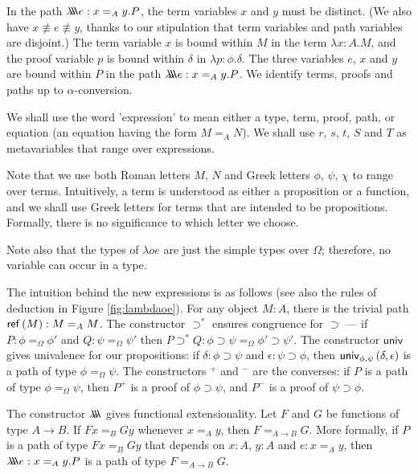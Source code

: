 In the path $\lambda \!\! \lambda \!\! \lambda e : x =_A y . P$, the term variables $x$ and $y$ must be distinct.  (We also have $x \not\equiv e \not\equiv y$, thanks to our
stipulation that term variables and path variables are disjoint.)  The term variable $x$ is bound within $M$ in the term $\lambda x:A.M$,
and the proof variable $p$ is bound within $\delta$ in $\lambda p:\phi.\delta$.  The three variables $e$, $x$ and $y$ are bound within $P$ in the path
$\lambda \!\! \lambda \!\! \lambda e:x =_A y.P$.  We identify terms, proofs and paths up to $\alpha$-conversion.

We shall use the word 'expression' to mean either a type, term, proof, path, or equation (an equation having the form $M =_A N$).  We shall use $r$, $s$, $t$, $S$ and $T$ as metavariables that range over expressions.

Note that we use both Roman letters $M$, $N$ and Greek letters $\phi$, $\psi$, $\chi$ to range over terms.  Intuitively, a term is understood as either a proposition or a function,
and we shall use Greek letters for terms that are intended to be propositions.  Formally, there is no significance to which letter we choose.

Note also that the types of $\lambda o e$ are just the simple types over $\Omega$; therefore, no variable can occur in a type.

The intuition behind the new expressions is as follows (see also the rules of deduction in Figure \ref{fig:lambdaoe}).  For any object $M : A$, there is the trivial path $\mathsf{ref} \left( {M} \right) : M =_A M$.  The constructor $\supset^*$ ensures congruence for $\supset$ --- if $P : \phi =_\Omega \phi'$ and $Q : \psi =_\Omega \psi'$ then $P \supset^* Q : \phi \supset \psi =_\Omega \phi' \supset \psi'$.  The constructor $\mathsf{univ}$ gives univalence for our propositions: if $\delta : \phi \supset \psi$ and $\epsilon : \psi \supset \phi$, then $\mathsf{univ}_{{\phi} , {\psi}} \left( {\delta} , {\epsilon} \right)$ is a path of type $\phi =_\Omega \psi$.  The constructors $^+$ and $^-$ are the converses: if $P$ is a path of type $\phi =_\Omega \psi$, then $P^+$ is a proof of $\phi \supset \psi$, and $P^-$ is a proof of $\psi \supset \phi$.

The constructor $\lambda \!\! \lambda \!\! \lambda$ gives functional extensionality.  Let $F$ and $G$ be functions of type $A \rightarrow B$.  If $F x =_B G y$ whenever $x =_A y$, then $F =_{A \rightarrow B} G$.  More formally, if $P$ is a path of type $Fx =_B Gy$ that depends on $x : A$, $y : A$ and $e : x =_A y$, then $\lambda \!\! \lambda \!\! \lambda e : x =_A y . P$ is a path of type $F =_{A \rightarrow B} G$.

